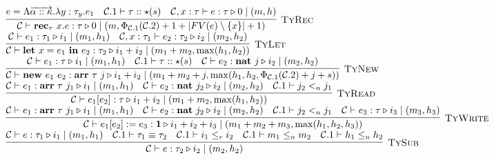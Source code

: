 \documentclass[fleqn]{article}
\begin{document}
\[\begin{array}{l}
	\infer[\textsc{TyRec}]{\jtygc{\mathcal{C} }{ \mathbf{rec}_\tau~x. e }{ \tau }{ 0 }{ m}{\Phi_{\mathcal{C}.1}(\mathcal{C}.2)+1+|FV(e)\setminus\{x\}|+1}}{e = \Lambda \overrightarrow{\alpha :: \kappa}. \lambda y : \tau_y. e_1 & \mathcal{C}.1 \vdash \tau :: \star(s) & \jtygc{\mathcal{C},x:\tau }{ e }{ \tau }{ 0 }{ m}{h}} \\
	\infer[\textsc{TyLet}]{\jtygc{\mathcal{C} }{ \mathbf{let}~x=e_1~\mathbf{in}~e_2 }{ \tau_2 }{ i_1 + i_2 }{ m_1 + m_2}{\max(h_1,h_2)}}{\jtygc{\mathcal{C} }{ e_1 }{ \tau_1 }{ i_1 }{ m_1 }{h_1} & \jtygc{\mathcal{C},x:\tau_1 }{ e_2 }{ \tau_2 }{ i_2 }{ m_2}{h_2}} \\
	\infer[\textsc{TyNew}]{\jtygc{\mathcal{C} }{ \mathbf{new}~e_1~e_2 }{ \mathbf{arr}~\tau~j }{ i_1 + i_2 }{ m_1 + m_2 + j}{\max(h_1,h_2,\Phi_{\mathcal{C}.1}(\mathcal{C}.2)+j+s)}}{\jtygc{\mathcal{C} }{ e_1 }{\tau }{ i_1 }{ m_1}{h_1} & \mathcal{C}.1 \vdash \tau :: \star(s) & \jtygc{\mathcal{C} }{ e_2 }{ \mathbf{nat}~j }{ i_2 }{ m_2}{h_2}} \\
	\infer[\textsc{TyRead}]{\jtygc{\mathcal{C} }{ e_1[e_2] }{ \tau }{ i_1 + i_2 }{ m_1 + m_2}{\max(h_1,h_2)}}{\jtygc{\mathcal{C} }{ e_1 }{ \mathbf{arr}~\tau~j_1 }{ i_1 }{ m_1}{h_1} & \jtygc{\mathcal{C} }{ e_2 }{ \mathbf{nat}~j_2 }{ i_2 }{ m_2}{h_2} & \mathcal{C}.1 \vdash j_2 <_n j_1} \\
	\infer[\textsc{TyWrite}]{\jtygc{\mathcal{C} }{ e_1[e_2] := e_3 }{ \mathbf{1} }{ i_1 + i_2 + i_3 }{ m_1 + m_2 + m_3}{\max(h_1,h_2,h_3)}}{\jtygc{\mathcal{C} }{ e_1 }{ \mathbf{arr}~\tau~j_1 }{ i_1 }{ m_1}{h_1} & \jtygc{\mathcal{C} }{ e_2 }{\mathbf{nat}~j_2 }{ i_2 }{ m_2}{h_2} & \mathcal{C}.1 \vdash j_2 <_n j_1 & \jtygc{\mathcal{C} }{ e_3 }{ \tau }{ i_3 }{ m_3}{h_3}} \\
	\infer[\textsc{TySub}]{\jtygc{\mathcal{C} }{ e }{\tau_2 }{ i_2 }{ m_2}{h_2}}{\jtygc{\mathcal{C} }{ e }{ \tau_1 }{ i_1 }{ m_1 }{h_1} & \mathcal{C}.1 \vdash \tau_1 \equiv \tau_2 & \mathcal{C}.1 \vdash i_1 \le_r i_2 & \mathcal{C}.1 \vdash m_1 \le_n m_2 & \mathcal{C}.1 \vdash h_1 \le_n h_2}
\end{array}
\]
\end{document}
